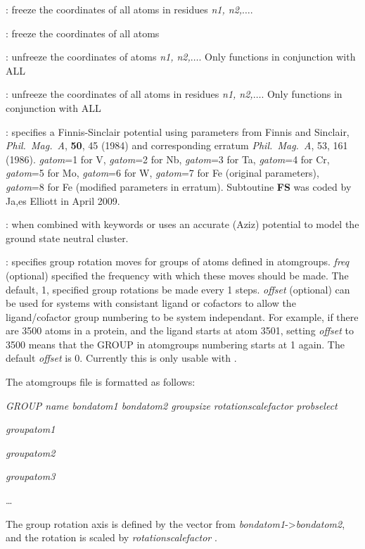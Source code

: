 : freeze the coordinates of all atoms in residues {\it n1, n2,$\ldots$}.

: freeze the coordinates of all atoms 

: unfreeze the coordinates of atoms {\it n1, n2,$\ldots$}. Only functions in conjunction with 
{ALL\/}

: unfreeze the coordinates of all atoms in residues {\it n1, n2,$\ldots$}. Only functions in conjunction with 
{ALL\/}

: specifies a Finnis-Sinclair potential using parameters from 
Finnis and Sinclair, {\it Phil.~Mag.~A}, {\bf 50}, 45 (1984) 
and corresponding erratum {\it Phil.~Mag.~A}, 53, 161 (1986). 
{\it gatom}=1 for V, {\it gatom}=2 for Nb, {\it gatom}=3 for Ta, {\it gatom}=4 
for Cr, {\it gatom}=5 for Mo, {\it gatom}=6 for W, {\it gatom}=7 
for Fe (original parameters), {\it gatom}=8 for Fe (modified parameters in erratum). 
Subtoutine {\bf FS} was coded by Ja,es Elliott in April 2009.

: when combined with keywords {\/} or {\/}
uses an accurate (Aziz) potential to model the ground state neutral cluster.

: specifies group rotation moves for groups of atoms defined in {\rm atomgroups}. {\it freq\/} 
(optional) specified the frequency with which these moves should be made. The default, 1, specified group rotations be made every 1 steps. 
{\it offset\/} (optional) can be used for systems with consistant ligand or cofactors to allow the ligand/cofactor group numbering to be
system independant. For example, if there are 3500 atoms in a protein, and the ligand starts at atom 3501, setting {\it offset} to 3500 means
that the GROUP in {\textrm atomgroups} numbering starts at 1 again. The default {\it offset\/} is 0. Currently this is only usable with 
{\/}.

The {\textrm atomgroups} file is formatted as follows:

{\it GROUP name bondatom1 bondatom2 groupsize rotationscalefactor probselect}

{\it groupatom1}

{\it groupatom2}

{\it groupatom3}

\ldots

The group rotation axis is defined by the vector from {\it bondatom1}->{\it bondatom2}, and the rotation is scaled by {\it rotationscalefactor}
.

